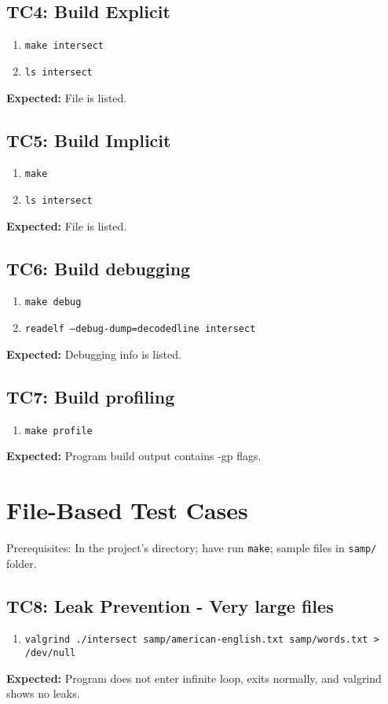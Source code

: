 \documentclass[11pt]{report}
\begin{document}
\subsection*{TC4: Build Explicit}
\begin{enumerate}
  \item {\texttt{\color{red}make intersect}}
  \item {\texttt{\color{red}ls intersect}}
\end{enumerate}
\textbf{Expected:} File is listed.
\subsection*{TC5: Build Implicit}
\begin{enumerate}
  \item {\texttt{\color{red}make}}
  \item {\texttt{\color{red}ls intersect}}
\end{enumerate}
\textbf{Expected:} File is listed.
\subsection*{TC6: Build debugging}
\begin{enumerate}
  \item {\texttt{\color{red}make debug}}
  \item {\texttt{\color{red}readelf --debug-dump=decodedline intersect}}
\end{enumerate}
\textbf{Expected:} Debugging info is listed.
\subsection*{TC7: Build profiling}
\begin{enumerate}
  \item {\texttt{\color{red}make profile}}
\end{enumerate}
\textbf{Expected:} Program build output contains -gp flags.
\pagebreak
\section*{File-Based Test Cases}
Prerequisites: In the project's directory; have run {\texttt{\color{red}make}}; sample files in {\texttt{\color{red}samp/}} folder.
\subsection*{TC8: Leak Prevention - Very large files}
\begin{enumerate}
  \item {\texttt{\color{red}valgrind ./intersect samp/american-english.txt samp/words.txt > /dev/null}}
\end{enumerate}
\textbf{Expected:} Program does not enter infinite loop, exits normally, and valgrind shows no leaks.
\end{document}
